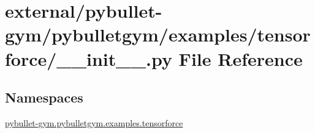 \hypertarget{external_2pybullet-gym_2pybulletgym_2examples_2tensorforce_2____init_____8py}{}\section{external/pybullet-\/gym/pybulletgym/examples/tensorforce/\+\_\+\+\_\+init\+\_\+\+\_\+.py File Reference}
\label{external_2pybullet-gym_2pybulletgym_2examples_2tensorforce_2____init_____8py}
\subsection*{Namespaces}
\begin{DoxyCompactItemize}
\item 
 \hyperlink{namespacepybullet-gym_1_1pybulletgym_1_1examples_1_1tensorforce}{pybullet-\/gym.\+pybulletgym.\+examples.\+tensorforce}
\end{DoxyCompactItemize}
